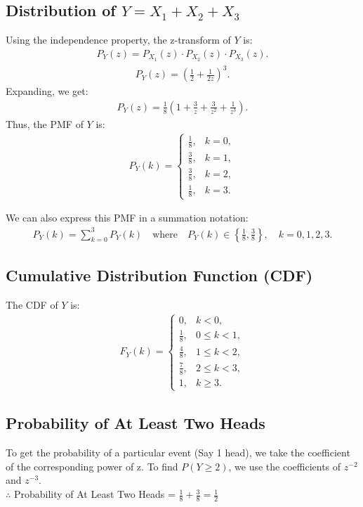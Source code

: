 \documentclass[journal]{IEEEtran}
\begin{document}
\subsection{Distribution of $ Y = X_1 + X_2 + X_3 $}
Using the independence property, the z-transform of $Y$ is:
\begin{align}
P_Y(z) = P_{X_1}(z) \cdot P_{X_2}(z) \cdot P_{X_3}(z).
\end{align}
\begin{align}
P_Y(z) = \left(\frac{1}{2} + \frac{1}{2z}\right)^3.
\end{align}
Expanding, we get:
\begin{align}
P_Y(z) = \frac{1}{8} \left(1 + \frac{3}{z} + \frac{3}{z^2} + \frac{1}{z^3}\right).
\end{align}
Thus, the PMF of $Y$ is:
\begin{align}
P_{Y}(k) =
\begin{cases}
\frac{1}{8}, & k = 0, \\
\frac{3}{8}, & k = 1, \\
\frac{3}{8}, & k = 2, \\
\frac{1}{8}, & k = 3.
\end{cases}
\end{align}

We can also express this PMF in a summation notation:
\begin{align}
P_Y(k) = \sum_{k=0}^{3} P_Y(k) \quad \text{where} \quad P_Y(k) \in \left\{ \frac{1}{8}, \frac{3}{8} \right\}, \quad k = 0, 1, 2, 3.
\end{align}

\subsection{Cumulative Distribution Function (CDF)}
The CDF of $Y$ is:
\begin{align}
F_Y(k) =
\begin{cases}
0, & k < 0, \\
\frac{1}{8}, & 0 \leq k < 1, \\
\frac{4}{8}, & 1 \leq k < 2, \\
\frac{7}{8}, & 2 \leq k < 3, \\
1, & k \geq 3.
\end{cases}
\end{align}

\subsection{Probability of At Least Two Heads}
To get the probability of a particular event (Say 1 head), we take the coefficient of the corresponding power of z.
To find $ P(Y \geq 2) $, we use the coefficients of $z^{-2}$ and $z^{-3}$.\\
$\therefore$ Probability of At Least Two Heads = $\frac{1}{8} + \frac{3}{8} = \frac{1}{2}$
\end{document}
